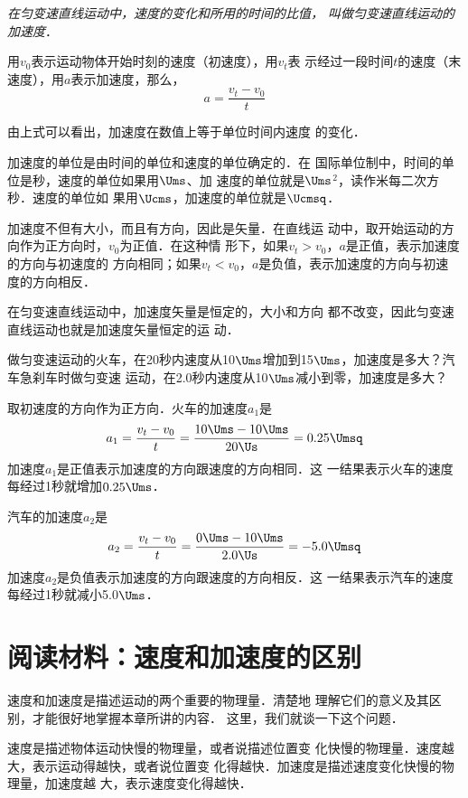 \textit{在匀变速直线运动中，速度的变化和所用的时间的比值，
叫做匀变速直线运动的加速度}．

用$v_0$表示运动物体开始时刻的速度（初速度），用$v_t$表
示经过一段时间$t$的速度（末速度），用$a$表示加速度，那么，
\[a=\frac{v_t-v_0}{t}\]

由上式可以看出，加速度在数值上等于单位时间内速度
的变化．

    加速度的单位是由时间的单位和速度的单位确定的．在
国际单位制中，时间的单位是秒，速度的单位如果用$\Ums$、加
速度的单位就是$\Ums$$^2$，读作米每二次方秒．速度的单位如
果用$\Ucms$，加速度的单位就是$\Ucmsq$．

    加速度不但有大小，而且有方向，因此是矢量．在直线运
动中，取开始运动的方向作为正方向时，$v_0$为正值．在这种情
形下，如果$v_t>v_0$，$a$是正值，表示加速度的方向与初速度的
方向相同；如果$v_t<v_0$，$a$是负值，表示加速度的方向与初速
度的方向相反．

    在匀变速直线运动中，加速度矢量是恒定的，大小和方向
都不改变，因此匀变速直线运动也就是加速度矢量恒定的运
动．

\begin{example}
做匀变速运动的火车，在20秒内速度从10$\Ums$增加到15$\Ums$，加速度是多大？汽车急刹车时做匀变速
运动，在2.0秒内速度从10$\Ums$减小到零，加速度是多大？
\end{example}

\begin{solution}
取初速度的方向作为正方向．火车的加速度$a_1$是
\[a_1=\frac{v_t-v_0}{t}=\frac{10 \Ums -10\Ums}{20\Us}=0.25\Umsq \]
加速度$a_1$是正值表示加速度的方向跟速度的方向相同．这
一结果表示火车的速度每经过1秒就增加$0.25 \Ums $．

汽车的加速度$a_2$是
\[a_2=\frac{v_t-v_0}{t}=\frac{0\Ums-10\Ums}{2.0\Us }=-5.0\Umsq  \]
加速度$a_2$是负值表示加速度的方向跟速度的方向相反．这
一结果表示汽车的速度每经过1秒就减小5.0$\Ums$．

\end{solution}

\section*{阅读材料：速度和加速度的区别}
    速度和加速度是描述运动的两个重要的物理量．清楚地
理解它们的意义及其区别，才能很好地掌握本章所讲的内容．
这里，我们就谈一下这个问题．

    速度是描述物体运动快慢的物理量，或者说描述位置变
化快慢的物理量．速度越大，表示运动得越快，或者说位置变
化得越快．加速度是描述速度变化快慢的物理量，加速度越
大，表示速度变化得越快．

